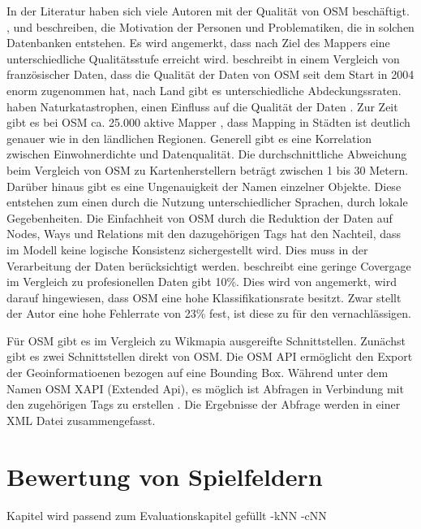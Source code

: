 In der Literatur haben sich viele Autoren mit der Qualität von OSM beschäftigt.
\cite{Haklay.2010}, \cite{Flanagin.2008} und \cite{Goodchild.2007} beschreiben, die Motivation der Personen und Problematiken, die in solchen Datenbanken entstehen. Es wird angemerkt, dass nach Ziel des Mappers eine unterschiedliche Qualitätsstufe erreicht wird.
\cite{Girres.2010} beschreibt in einem Vergleich von französischer Daten, dass die Qualität der Daten von OSM seit dem Start in 2004 enorm zugenommen hat, nach Land gibt es unterschiedliche Abdeckungssraten. haben Naturkatastrophen, einen Einfluss auf die Qualität der Daten \cite{Zook.2010}.
Zur Zeit gibt es bei OSM ca. 25.000 aktive Mapper \cite{OSM.2013}, dass Mapping in Städten ist deutlich genauer wie in den ländlichen Regionen. Generell gibt es eine Korrelation zwischen Einwohnerdichte und Datenqualität.
Die durchschnittliche Abweichung beim Vergleich von OSM zu Kartenherstellern beträgt zwischen 1 bis 30 Metern.
Darüber hinaus gibt es eine Ungenauigkeit der Namen einzelner Objekte. Diese entstehen zum einen durch die Nutzung unterschiedlicher Sprachen, durch lokale Gegebenheiten.
Die Einfachheit von OSM durch die Reduktion der Daten auf Nodes, Ways und Relations mit den dazugehörigen Tags hat den Nachteil, dass im Modell keine logische Konsistenz sichergestellt wird. Dies muss in der Verarbeitung der Daten berücksichtigt werden.
\cite{Hecht.2013} beschreibt eine geringe Covergage im Vergleich zu profesionellen Daten gibt 10\%. Dies wird von \cite{Pfoser.2013} angemerkt, wird darauf hingewiesen, dass OSM eine hohe Klassifikationsrate besitzt. Zwar stellt der Autor eine hohe Fehlerrate von 23\% fest, ist diese zu für den vernachlässigen.

Für OSM gibt es im Vergleich zu Wikmapia ausgereifte Schnittstellen. Zunächst gibt es zwei Schnittstellen direkt von OSM.
Die OSM API ermöglicht den Export der Geoinformatioenen bezogen auf eine Bounding Box. Während unter dem Namen OSM XAPI (Extended Api), es möglich ist Abfragen in Verbindung mit den zugehörigen Tags zu erstellen \cite{Meyer.2013}. Die Ergebnisse der Abfrage werden in einer XML Datei zusammengefasst.



\section{Bewertung von Spielfeldern}
\label{ch3:s:geostatistik}

Kapitel wird passend zum Evaluationskapitel gefüllt
-kNN
-cNN
